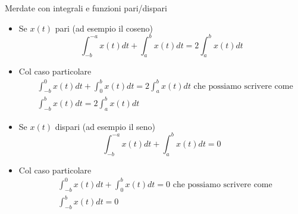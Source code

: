 \documentclass{article}
\begin{document}

Merdate con integrali e funzioni pari/dispari
\begin{itemize}
  \item Se $x(t)$ pari (ad esempio il coseno) \begin{equation*}
    \int_{-b}^{-a} x(t) dt + \int_{a}^{b} x(t) dt = 2\int_{a}^{b} x(t) dt
  \end{equation*}

  \item Col caso particolare \begin{align*}
    &\int_{-b}^{0} x(t) dt + \int_{0}^{b} x(t) dt = 2\int_{a}^{b} x(t) dt \text{ che possiamo scrivere come}\\
    &\int_{-b}^{b} x(t) dt = 2\int_{a}^{b} x(t) dt
  \end{align*}

  \item Se $x(t)$ dispari (ad esempio il seno) \begin{equation*}
    \int_{-b}^{-a} x(t) dt + \int_{a}^{b} x(t) dt = 0
  \end{equation*}

  \item Col caso particolare \begin{align*}
    &\int_{-b}^{0} x(t) dt + \int_{0}^{b} x(t) dt = 0 \text{ che possiamo scrivere come}\\
    &\int_{-b}^{b} x(t) dt = 0
  \end{align*}
\end{itemize}
\end{document}
